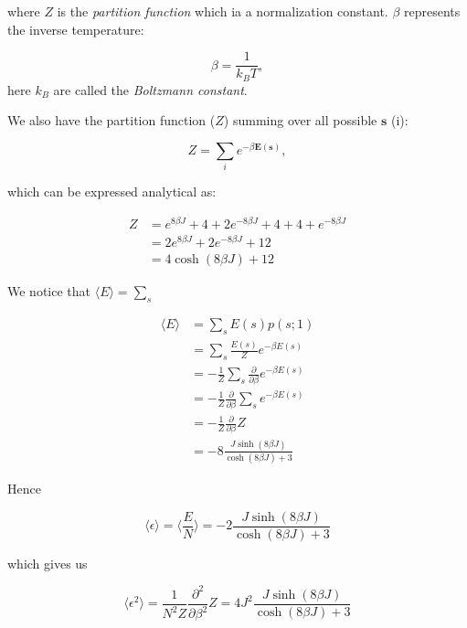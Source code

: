 \documentclass[english,notitlepage,reprint,nofootinbib]{revtex4-1}  %
\begin{document}
where $Z$ is the \textit{partition function} which ia a normalization constant. $\beta$ represents the inverse temperature:

\begin{equation}
    \beta = \frac{1}{k_B T},
\end{equation}
here $k_B$ are called the \textit{Boltzmann constant}.

We also have the partition function ($Z$) summing over all possible $\textbf{s}$ (i):

\begin{equation}
    Z = \sum\limits_{i} e^{- \beta \mathbf{E}(\mathbf{s})},
\end{equation}

which can be expressed analytical as:

\begin{align*}
    Z %
    &= e^{8 \beta J} + 4 + 2 e^{-8 \beta J} + 4 + 4 + e^{-8 \beta J} \\
    &= 2e^{8 \beta J} + 2e^{-8 \beta J} + 12 \\
    &= 4 \cosh (8 \beta J) + 12
\end{align*}

We notice that $\langle E\rangle = \sum\limits_{s}$

\begin{align*}
    \langle E\rangle &= \sum\limits_{s} E(s) p(s;1)\\
    &= \sum\limits_{s} \frac{E(s)}{Z} e^{- \beta E(s)} \\
    &= - \frac{1}{Z} \sum\limits_{s} \frac{\partial}{\partial \beta} e^{- \beta E(s)} \\
    &= - \frac{1}{Z} \frac{\partial}{\partial \beta} \sum\limits_{s} e^{- \beta E(s)} \\
    &= - \frac{1}{Z} \frac{\partial}{\partial \beta} Z \\
    &= -8 \frac{J \sinh (8 \beta J)}{\cosh (8 \beta J) + 3}
\end{align*}

Hence

\begin{equation}
    \langle \epsilon\rangle = \langle \frac{E}{N}\rangle = -2 \frac{J \sinh (8 \beta J)}{\cosh (8 \beta J) + 3}
\end{equation}

which gives us

\begin{equation}
    \langle \epsilon^2\rangle  = \frac{1}{N^2 Z} \frac{\partial^2}{\partial \beta^2} Z = 4 J^2 \frac{J \sinh (8 \beta J)}{\cosh (8 \beta J) + 3}
\end{equation}
\end{document}
